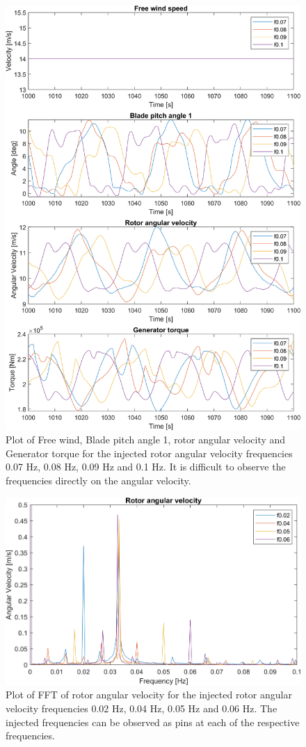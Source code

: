 \begin{figure}[ht]
	\centering
	\includegraphics[width=0.8\linewidth]{Graphics/TestResults/tj00/tjj0_f07to1_VfreeToMgen.png}
	\caption{Plot of Free wind, Blade pitch angle 1, rotor angular velocity and Generator torque for the injected rotor angular velocity frequencies 0.07 Hz, 0.08 Hz, 0.09 Hz and 0.1 Hz. It is difficult to observe the frequencies directly on the angular velocity.}
	\label{fig:tjj0_f07to1VfreeToMgen}
\end{figure}

\begin{figure}[ht]
	\centering
	\includegraphics[width=0.8\linewidth]{Graphics/TestResults/tj00/tjj0_f02to06OmegaFFT.png}
	\caption{Plot of FFT of rotor angular velocity for the injected rotor angular velocity frequencies 0.02 Hz, 0.04 Hz, 0.05 Hz and 0.06 Hz. The injected frequencies can be observed as pins at each of the respective frequencies.}
	\label{fig:tjj0_f02to06OmegaFFT}
\end{figure}

